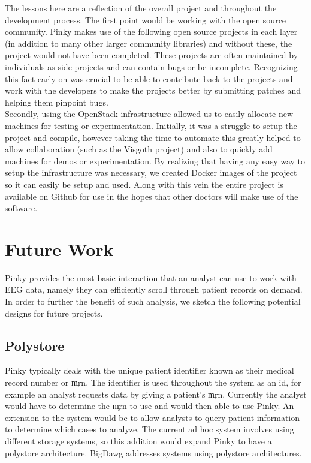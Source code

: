 The lessons here are a reflection of the overall project and throughout the
development process. The first point would be working with the open source
community. Pinky makes use of the following open source projects \cite{edflib}
\cite{dropbox-json} \cite{websocket-server} \cite{tiledb} \cite{happyhttp} in
each layer (in addition to many other larger community libraries) and without
these, the project would not have been completed. These projects are often
maintained by individuals as side projects and can contain bugs or be
incomplete. Recognizing this fact early on was crucial to be able to contribute
back to the projects and work with the developers to make the projects better
by submitting patches and helping them pinpoint bugs. \\


Secondly, using the OpenStack infrastructure allowed us to easily allocate new
machines for testing or experimentation. Initially, it was a struggle to setup
the project and compile, however taking the time to automate this greatly
helped to allow collaboration (such as the Visgoth project) and also to quickly
add machines for demos or experimentation. By realizing that having any easy
way to setup the infrastructure was necessary, we created Docker \cite{docker}
images of the project so it can easily be setup and used.  Along with this vein
the entire project is available on Github \cite{eeg-toolkit} for use in the
hopes that other doctors will make use of the software.

\section{Future Work}\label{discuss-ch:future-work}

Pinky provides the most basic interaction that an analyst can use to work with
EEG data, namely they can efficiently scroll through patient records on demand.
In order to further the benefit of such analysis, we sketch the following
potential designs for future projects.

\subsection{Polystore}

Pinky typically deals with the unique patient identifier known as their medical
record number or \c{mrn}. The identifier is used throughout the system as an
id, for example an analyst requests data by giving a patient's \c{mrn}.
Currently the analyst would have to determine the \c{mrn} to use and would then
able to use Pinky. An extension to the system would be to allow analysts to
query patient information to determine which cases to analyze. The current ad
hoc system involves using different storage systems, so this addition would
expand Pinky to have a polystore architecture. BigDawg \cite{bigdawg} addresses
systems using polystore architectures. \\

